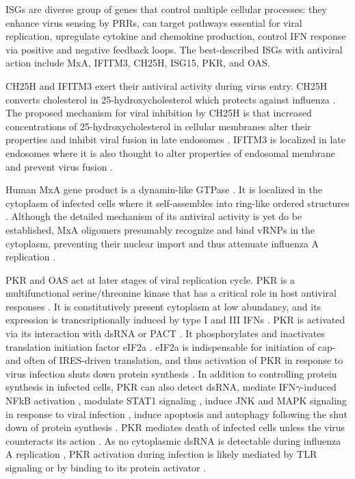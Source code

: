 		\glspl{ISG} are diverse group of genes that control multiple cellular processes: they enhance virus sensing by \gls{PRR}s, can target pathways essential for viral replication, upregulate cytokine and chemokine production, control \gls{IFN} response via positive and negative feedback loops. The best-described \gls{ISG}s with antiviral action include \gls{MxA}, \gls{IFITM3}, \gls{CH25H}, \gls{ISG15}, \gls{PKR}, and \gls{OAS}. 
		
		\gls{CH25H} and \gls{IFITM3} exert their antiviral activity during virus entry. \gls{CH25H} converts cholesterol in 25-hydroxycholesterol which   protects against influenza \parencite{Blanc2013}. The proposed mechanism for viral inhibition by \gls{CH25H} is that increased concentrations of 25-hydroxycholesterol in cellular membranes alter their properties and inhibit viral fusion in late endosomes \parencite{Liu2013}. \gls{IFITM3} is localized in late endosomes where it is also thought to alter properties of endosomal membrane and prevent virus fusion \parencite{Li2013, Desai2014}. 
				
		Human \gls{MxA} gene product is a dynamin-like \gls{GTPase} \parencite{Nakayama1992}. It is localized in the cytoplasm of infected cells where it self-assembles into ring-like ordered structures \parencite{Gao2010}. Although the detailed mechanism of its antiviral activity is yet do be established, \gls{MxA} oligomers presumably recognize and bind \gls{vRNP}s in the cytoplasm, preventing their nuclear import and thus attenuate influenza A replication \parencite{Haller2010}.
		
		\gls{PKR} and \gls{OAS} act at later stages of viral replication cycle. \gls{PKR} is a multifunctional serine/threonine kinase that has a critical role in host antiviral responses \parencite{Garcia2006a}. It is constitutively present cytoplasm at low abundancy, and its expression is trancsriptionally induced by type I and III \gls{IFN}s \parencite{Meurs1990}. \gls{PKR} is activated via its interaction with dsRNA or \gls{PACT} \parencite{Li2006a}. It phosphorylates and inactivates translation initiation factor \gls{eIF2a} \parencite{Levin1978}. \gls{eIF2a} is indispensable for initiation of cap- and often of \gls{IRES}-driven translation, and thus activation of \gls{PKR} in response to virus infection shuts down protein synthesis \parencite{Kimball1999}. In addition to controlling protein synthesis in infected cells, \gls{PKR} can also detect dsRNA, mediate \gls{IFN}$\gamma$-induced \gls{NFkB} activation \parencite{Deb2001}, modulate \gls{STAT}1 signaling \parencite{Wong1997}, induce \gls{JNK} and \gls{MAPK} signaling in response to viral infection \parencite{Chu1999}, induce apoptosis and autophagy following the shut down of protein synthesis \parencite{Gil2000, Talloczy2002}. \gls{PKR} mediates death of infected cells unless the virus counteracts its action \parencite{Takizawa1996, Hatada1999}. As no cytoplasmic dsRNA is  detectable during influenza A replication \parencite{Wisskirchen2011}, \gls{PKR} activation during infection is likely mediated by \gls{TLR} signaling \parencite{Jiang2003} or by binding to its protein activator \parencite{Garcia2006a}.
		
